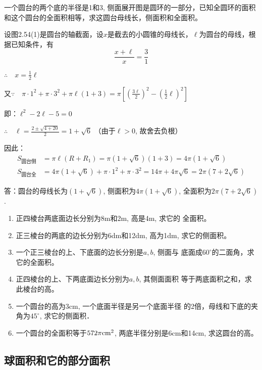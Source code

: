 \begin{example}
    一个圆台的两个底的半径是1和3, 侧面展开图是圆环的一部分，已知全圆环的面积和这个圆台的全面积相等，求这圆台母线长，侧面积和全面积。
\end{example}


\begin{solution}
设图2.54(1)是圆台的轴截面，设$x$是截去的小圆锥的母线长，$\ell$为圆台的母线，根据已知条件，有
\[\frac{x+\ell}{x}=\frac{3}{1}\]

$\therefore\quad x=\frac{1}{2}\ell$

又$\because\quad \pi\cdot 1^2+\pi\cdot 3^2+\pi\ell(1+3)=\pi\left[\left(\frac{3\ell}{2}\right)^2-\left(\frac{1}{2}\ell\right)^2\right]$

即：$\ell^2-2\ell-5=0$

$\therefore\quad \ell=\frac{2\pm\sqrt{4+20}}{2}=1+\sqrt{6}$ （由于$\ell>0$, 故舍去负根）

因此：
\[\begin{split}
S_{\text{圆台侧}}&=\pi \ell(R+R_1)=\pi  (1+\sqrt{6}) (1+3)=4\pi  (1+\sqrt{6})\\
S_{\text{圆台全}} &=4\pi (1+\sqrt{6})+\pi \cdot 1^2+\pi \cdot 3^2
=14\pi +4\pi \sqrt{6}=2\pi  (7+2\sqrt{6})
\end{split}\]

答：圆台的母线长为$(1+\sqrt{6})$, 侧面积为$4\pi(1+\sqrt{6})$, 全面积为$2\pi (7+2\sqrt{6})$.
\end{solution}

\begin{ex}
\begin{enumerate}
    \item 正四棱台两底面边长分别为8m和2m, 高是4m, 求它的
    全面积。
    \item 正三棱台的两底的边长分别为6dm和12dm, 高为1dm,
    求它的侧面积。
    \item 一个正三棱台的上、下底面的边长分别是$a,b$, 侧面与
    底面成$60^{\circ}$的二面角，求它的全面积。
    \item 正四棱台的上、下两底面边长分别为$a,b$, 其侧面面积
    等于两底面积之和，求此棱台的高。
    \item 一个圆台的高为3cm, 一个底面半径是另一个底面半径
    的2倍，母线和下底的夹角为$45^{\circ}$, 求它的侧面积．
    \item 一个圆台的全面积等于$572\pi{\rm cm^2}$, 两底半径分别是6cm和14cm, 求这圆台的高。
\end{enumerate}
\end{ex}

\subsection{球面积和它的部分面积}

